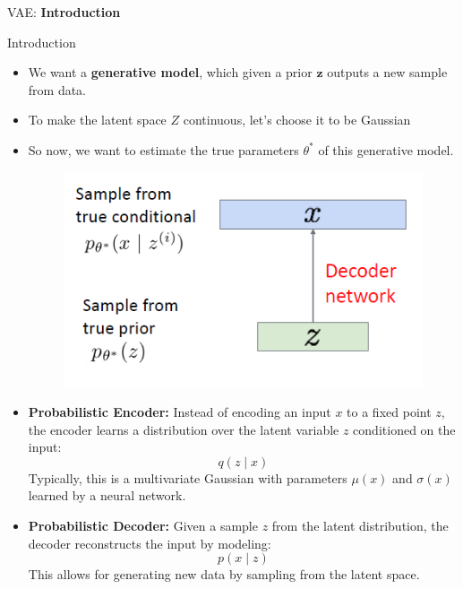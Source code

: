 \begin{frame}{}
    \LARGE VAE: \textbf{Introduction}
\end{frame}


\begin{frame}[allowframebreaks]{Introduction}
  \begin{itemize}
    \item We want a \textbf{generative model}, which given a prior $\mathbf{z}$ outputs a new sample from data.
    \item To make the latent space $Z$ continuous, let's choose it to be Gaussian
    \item So now, we want to estimate the true parameters $\theta^*$ of this generative model.
    \begin{figure}
        \centering
        \includegraphics[height=0.5\textheight, width=\textwidth, keepaspectratio]{./images/vae/abstract_model.png}
    \end{figure}
\end{itemize}

\framebreak

\begin{itemize}
  \item \textbf{Probabilistic Encoder:} Instead of encoding an input \( x \) to a fixed point \( z \), the encoder learns a distribution over the latent variable \( z \) conditioned on the input:
  \[ q(z \mid x) \]
  Typically, this is a multivariate Gaussian with parameters \( \mu(x) \) and \( \sigma(x) \) learned by a neural network.

  \framebreak
  
  \item \textbf{Probabilistic Decoder:} Given a sample \( z \) from the latent distribution, the decoder reconstructs the input by modeling:
  \[
  p(x \mid z)
  \]
  This allows for generating new data by sampling from the latent space.


\end{itemize}
\end{frame}
